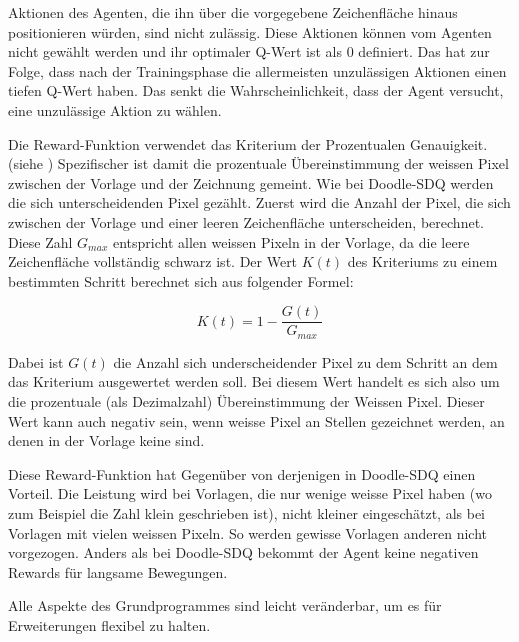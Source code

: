 Aktionen des Agenten, die ihn über die vorgegebene Zeichenfläche hinaus
positionieren würden, sind nicht zulässig. Diese Aktionen können vom Agenten
nicht gewählt werden und ihr optimaler Q-Wert ist als $0$ definiert. Das hat zur
Folge, dass nach der Trainingsphase die allermeisten unzulässigen Aktionen einen
tiefen Q-Wert haben. Das senkt die Wahrscheinlichkeit, dass der Agent versucht,
eine unzulässige Aktion zu wählen.

Die Reward-Funktion verwendet das Kriterium der Prozentualen Genauigkeit. (siehe )
Spezifischer ist damit die prozentuale Übereinstimmung der weissen Pixel
zwischen der Vorlage und der Zeichnung gemeint. Wie bei Doodle-SDQ werden die
sich unterscheidenden Pixel gezählt. Zuerst wird die Anzahl der Pixel, die sich
zwischen der Vorlage und einer leeren Zeichenfläche unterscheiden, berechnet.
Diese Zahl $G_{max}$ entspricht allen weissen Pixeln in der Vorlage, da die
leere Zeichenfläche vollständig schwarz ist. Der Wert $K(t)$ des Kriteriums zu
einem bestimmten Schritt berechnet sich aus folgender Formel:

\begin{equation}
    \label{eq:m_reward}
    K(t) = 1 - \frac{G(t)}{G_{max}}
\end{equation}

Dabei ist $G(t)$ die Anzahl sich underscheidender Pixel zu dem Schritt an dem
das Kriterium ausgewertet werden soll. Bei diesem Wert handelt es sich also um
die prozentuale (als Dezimalzahl) Übereinstimmung der Weissen Pixel. Dieser Wert
kann auch negativ sein, wenn weisse Pixel an Stellen gezeichnet werden, an denen
in der Vorlage keine sind.

Diese Reward-Funktion hat Gegenüber von derjenigen in
Doodle-SDQ einen Vorteil. Die Leistung wird bei Vorlagen, die nur wenige weisse
Pixel haben (wo zum Beispiel die Zahl klein geschrieben ist), nicht kleiner
eingeschätzt, als bei Vorlagen mit vielen weissen Pixeln. So werden gewisse
Vorlagen anderen nicht vorgezogen. Anders als bei Doodle-SDQ bekommt der Agent
keine negativen Rewards für langsame Bewegungen.

Alle Aspekte des Grundprogrammes sind leicht veränderbar, um es für
Erweiterungen flexibel zu halten.


